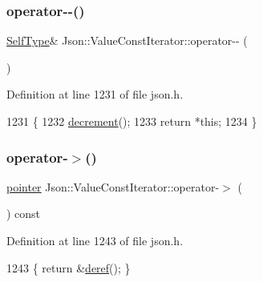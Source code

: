 \subsubsection{\texorpdfstring{operator-\/-\/()}{operator--()}\hspace{0.1cm}{\footnotesize\ttfamily [2/2]}}
{\footnotesize\ttfamily \hyperlink{class_json_1_1_value_iterator_base_a9d2a940d03ea06d20d972f41a89149ee}{Self\+Type}\& Json\+::\+Value\+Const\+Iterator\+::operator-\/-\/ (\begin{DoxyParamCaption}{ }\end{DoxyParamCaption})\hspace{0.3cm}{\ttfamily [inline]}}



Definition at line 1231 of file json.\+h.


\begin{DoxyCode}
1231                          \{
1232     \hyperlink{class_json_1_1_value_iterator_base_affc8cf5ff54a9f432cc693362c153fa6}{decrement}();
1233     \textcolor{keywordflow}{return} *\textcolor{keyword}{this};
1234   \}
\end{DoxyCode}
\mbox{\label{class_json_1_1_value_const_iterator_a3c608ae53c192ee846eb265bae1cfeec}} 
\subsubsection{\texorpdfstring{operator-\/$>$()}{operator->()}}
{\footnotesize\ttfamily \hyperlink{class_json_1_1_value_const_iterator_a400136bd8bc09e9fddec0785fa2cff14}{pointer} Json\+::\+Value\+Const\+Iterator\+::operator-\/$>$ (\begin{DoxyParamCaption}{ }\end{DoxyParamCaption}) const\hspace{0.3cm}{\ttfamily [inline]}}



Definition at line 1243 of file json.\+h.


\begin{DoxyCode}
1243 \{ \textcolor{keywordflow}{return} &\hyperlink{class_json_1_1_value_iterator_base_aa5b75c9514a30ba2ea3c9a35c165c18e}{deref}(); \}
\end{DoxyCode}
\mbox{\label{class_json_1_1_value_const_iterator_ad1b1c11f8d7fb22d4d3c231915f2b15b}} 
